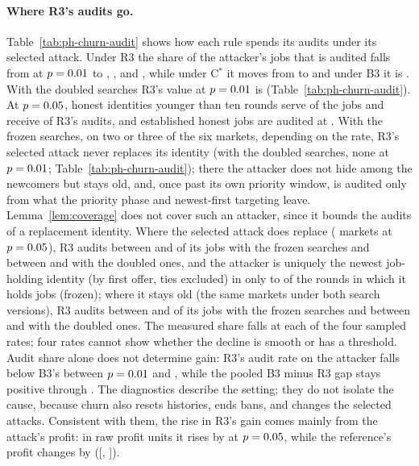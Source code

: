 \documentclass[11pt]{article}
\begin{document}
\paragraph{Where R3's audits go.} Table~\ref{tab:ph-churn-audit} shows how each rule spends its audits under its selected attack. Under R3 the share of the attacker's jobs that is audited falls from  at $p = 0.01$ to , , and , while under C$^*$ it moves from  to  and under B3 it is . With the doubled searches R3's value at $p = 0.01$ is  (Table~\ref{tab:ph-churn-audit}). At $p = 0.05$, honest identities younger than ten rounds serve  of the jobs and receive  of R3's audits, and established honest jobs are audited at . With the frozen searches, on two or three of the six markets, depending on the rate, R3's selected attack never replaces its identity (with the doubled searches, none at $p = 0.01$; Table~\ref{tab:ph-churn-audit}); there the attacker does not hide among the newcomers but stays old, and, once past its own priority window, is audited only from what the priority phase and newest-first targeting leave. Lemma~\ref{lem:coverage} does not cover such an attacker, since it bounds the audits of a replacement identity. Where the selected attack does replace ( markets at $p = 0.05$), R3 audits between  and  of its jobs with the frozen searches and between  and  with the doubled ones, and the attacker is uniquely the newest job-holding identity (by first offer, ties excluded) in only  to  of the rounds in which it holds jobs (frozen); where it stays old (the same  markets under both search versions), R3 audits between  and  of its jobs with the frozen searches and between  and  with the doubled ones. The measured share falls at each of the four sampled rates; four rates cannot show whether the decline is smooth or has a threshold. Audit share alone does not determine gain: R3's audit rate on the attacker falls below B3's between $p = 0.01$ and , while the pooled B3 minus R3 gap stays positive through . The diagnostics describe the setting; they do not isolate the cause, because churn also resets histories, ends bans, and changes the selected attacks. Consistent with them, the rise in R3's gain comes mainly from the attack's profit: in raw profit units it rises by  at $p = 0.05$, while the reference's profit changes by  ([, ]).
\end{document}
